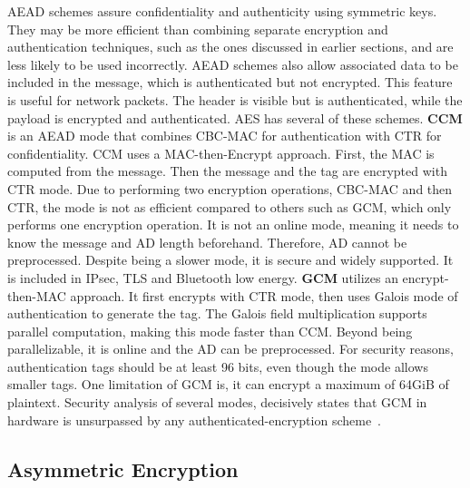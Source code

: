 \ac{AEAD} schemes assure confidentiality and authenticity using symmetric keys. They may be more efficient than combining separate encryption and authentication techniques, such as the ones discussed in earlier sections, and are less likely to be used incorrectly. \ac{AEAD} schemes also allow associated data to be included in the message, which is authenticated but not encrypted. This feature is useful for network packets. The header is visible but is authenticated, while the payload is encrypted and authenticated. 
\ac{AES} has several of these schemes. \textbf{\ac{CCM}} is an \ac{AEAD} mode that combines \ac{CBC-MAC} for authentication with \ac{CTR} for confidentiality.
\ac{CCM} uses a MAC-then-Encrypt approach. First, the \ac{MAC} is computed from the message. Then the message and the tag are encrypted with \ac{CTR} mode.
Due to performing two encryption operations, \ac{CBC-MAC} and then \ac{CTR}, the mode is not as efficient compared to others such as \ac{GCM}, which only performs one encryption operation.
It is not an online mode, meaning it needs to know the message and \ac{AD} length beforehand. Therefore, \ac{AD} cannot be preprocessed. %
Despite being a slower mode, it is secure and widely supported. It is included in \ac{IPsec}, \ac{TLS} and Bluetooth low energy.
\textbf{\ac{GCM}} utilizes an encrypt-then-MAC approach. It first encrypts with \ac{CTR} mode, then uses Galois mode of authentication to generate the tag. The Galois field multiplication supports parallel computation, making this mode faster than \ac{CCM}.
Beyond being parallelizable, it is online and the \ac{AD} can be preprocessed.
For security reasons, authentication tags should be at least 96 bits, even though the mode allows smaller tags. One limitation of \ac{GCM} is, it can encrypt a maximum of 64GiB of plaintext. Security analysis of several modes, decisively states that \ac{GCM} in hardware is unsurpassed by any authenticated-encryption scheme~\cite{aesmodes}.



\subsection{Asymmetric Encryption}\label{chap:background:crypto:assymetric}

